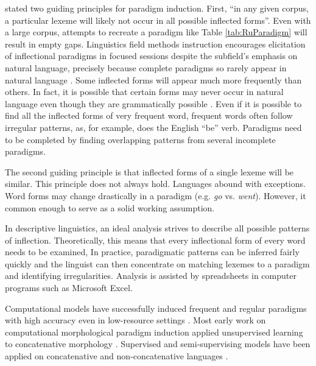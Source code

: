 \documentclass[12pt]{article}
\begin{document}
 stated two guiding principles for paradigm induction. First, ``in any given corpus, a particular lexeme will likely not occur in all possible inflected forms''.  Even with a large corpus, attempts to recreate a paradigm like Table \ref{tab:RuParadigm} will result in empty gaps. Linguistics field methods instruction encourages elicitation of inflectional paradigms in focused sessions despite the subfield's emphasis on natural language, precisely because complete paradigms so rarely appear in natural language \cite{lupke_data_2010,boerger_language_2016}. Some inflected forms will appear much more frequently than others. In fact, it is possible that certain forms may never occur in natural language even though they are grammatically possible \cite{silfverberg_encoder-decoder_2018}. Even if it is possible to find all the inflected forms of very frequent word, frequent words often follow irregular patterns, as, for example, does the English ``be'' verb. Paradigms need to be completed by finding overlapping patterns from several incomplete paradigms.

The second guiding principle is that inflected forms of a single lexeme will be similar. This principle does not always hold. Languages abound with exceptions. Word forms may change drastically in a paradigm (e.g. \textit{go} vs. \textit{went}). However, it common enough to serve as a solid working assumption.

In descriptive linguistics, 
an ideal analysis strives to describe all possible patterns of inflection. Theoretically, this means that every inflectional form of every word needs to be examined, In practice, paradigmatic patterns can be inferred fairly quickly and the linguist can then concentrate on matching lexemes to a paradigm and identifying irregularities. Analysis is assisted by spreadsheets in computer programs such as Microsoft Excel.

Computational models have successfully induced frequent and regular paradigms with high accuracy even in low-resource settings \cite{hammarstrom_unsupervised_2011,durrett_supervised_2013,ahlberg_semi-supervised_2014}. Most early work on computational morphological paradigm induction applied unsupervised learning to concatenative morphology \cite{goldsmith_unsupervised_2001,chan_learning_2006,monson_paramorfinding_2007b}. Supervised and semi-supervising models have been applied on concatenative and non-concatenative languages \cite{dreyer_discovering_2011,durrett_supervised_2013}. 
\end{document}
